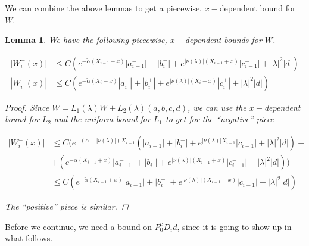 \documentclass[12pt]{article}
\newtheorem{lemma}{Lemma}
\begin{document}

We can combine the above lemmas to get a piecewise, $x-$dependent bound for $W$.

\begin{lemma}\label{piecewiseW1}
We have the following piecewise, $x-$dependent bounds for $W$.

\begin{align}
|W_i^-(x)| &\leq C ( e^{-\tilde{\alpha}(X_{i-1} + x)}|a_{i-1}^-| + |b_i^-| + e^{|\nu(\lambda)|(X_{i-1} + x)} |c_{i-1}^-| + |\lambda|^2 |d| ) \\
|W_i^+(x)| &\leq C ( e^{-\tilde{\alpha}(X_i - x)}|a_i^+| + |b_i^+| + e^{|\nu(\lambda)|(X_i - x)} |c_i^+| + |\lambda|^2 |d| )
\end{align}

\begin{proof}
Since $W = L_1(\lambda) W + L_2(\lambda)(a,b,c,d)$, we can use the $x-$dependent bound for $L_2$ and the uniform bound for $L_1$ to get for the ``negative'' piece

\begin{align*}
|W_i^-(x)| &\leq C \Big( e^{-(\alpha -|\nu(\lambda)|)X_{i-1}} ( |a_{i-1}^-| + |b_i^-| + e^{|\nu(\lambda)|X_{i-1}}|c_{i-1}^-| + |\lambda|^2 |d| ) + \\
&+ (e^{-\alpha(X_{i-1} + x)}|a_{i-1}^-| + |b_i^-| + e^{|\nu(\lambda)|(X_{i-1} + x)} |c_{i-1}^-| + |\lambda|^2 |d| ) \Big) \\
&\leq C ( e^{-\tilde{\alpha}(X_{i-1} + x)}|a_{i-1}^-| + |b_i^-| + e^{|\nu(\lambda)|(X_{i-1} + x)} |c_{i-1}^-| + |\lambda|^2 |d| )
\end{align*}

The ``positive'' piece is similar.

\end{proof}
\end{lemma}


Before we continue, we need a bound on $P^c_0 D_i d$, since it is going to show up in what follows.

\end{document}
